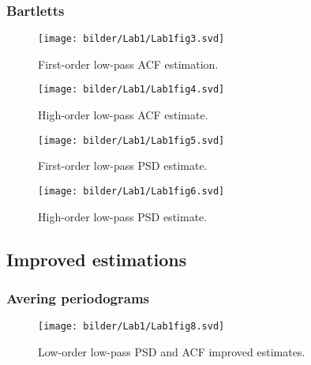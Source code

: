 
\subsubsection{Bartletts}

\begin{figure}[!ht]
\centering
\texttt{[image: bilder/Lab1/Lab1fig3.svd]}
\caption{First-order low-pass ACF estimation.}
\label{fig:Lab1fig3}
\end{figure}

\begin{figure}[!ht]
\centering
\texttt{[image: bilder/Lab1/Lab1fig4.svd]}
\caption{High-order low-pass ACF estimate.}
\label{fig:Lab1fig4}
\end{figure}

\begin{figure}[!ht]
\centering
\texttt{[image: bilder/Lab1/Lab1fig5.svd]}
\caption{First-order low-pass PSD estimate.}
\label{fig:Lab1fig5}
\end{figure}

\begin{figure}[!ht]
\centering
\texttt{[image: bilder/Lab1/Lab1fig6.svd]}
\caption{High-order low-pass PSD estimate.}
\label{fig:Lab1fig6}
\end{figure}


\subsection{Improved estimations}


\subsubsection{Avering periodograms}

\begin{figure}[!ht]
\centering
\texttt{[image: bilder/Lab1/Lab1fig8.svd]}
\caption{Low-order low-pass PSD and ACF improved estimates.}
\label{fig:Lab1fig8}
\end{figure}


